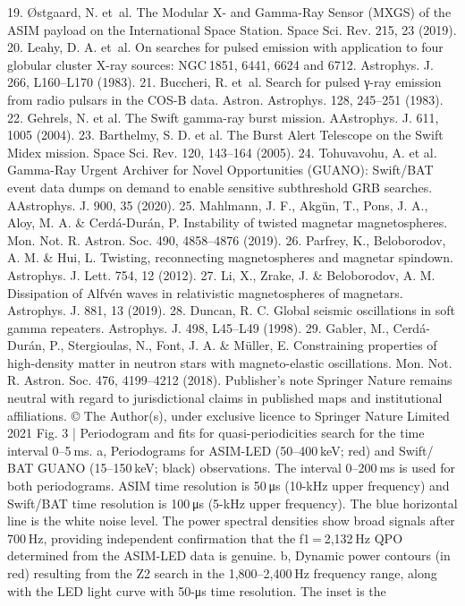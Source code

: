 19.
Østgaard, N. et al. The Modular X- and Gamma-Ray Sensor (MXGS) of the ASIM payload
on the International Space Station. Space Sci. Rev. 215, 23 (2019).
20.	 Leahy, D. A. et al. On searches for pulsed emission with application to four globular cluster
X-ray sources: NGC 1851, 6441, 6624 and 6712. Astrophys. J. 266, L160–L170 (1983).
21.
Buccheri, R. et al. Search for pulsed γ-ray emission from radio pulsars in the COS-B data.
Astron. Astrophys. 128, 245–251 (1983).
22.	 Gehrels, N. et al. The Swift gamma-ray burst mission. AAstrophys. J. 611, 1005 (2004).
23.	 Barthelmy, S. D. et al. The Burst Alert Telescope on the Swift Midex mission. Space Sci.
Rev. 120, 143–164 (2005).
24.	 Tohuvavohu, A. et al. Gamma-Ray Urgent Archiver for Novel Opportunities (GUANO):
Swift/BAT event data dumps on demand to enable sensitive subthreshold GRB searches.
AAstrophys. J. 900, 35 (2020).
25.	 Mahlmann, J. F., Akgün, T., Pons, J. A., Aloy, M. A. \& Cerdá-Durán, P. Instability of twisted
magnetar magnetospheres. Mon. Not. R. Astron. Soc. 490, 4858–4876 (2019).
26.	 Parfrey, K., Beloborodov, A. M. \& Hui, L. Twisting, reconnecting magnetospheres and
magnetar spindown. Astrophys. J. Lett. 754, 12 (2012).
27.
Li, X., Zrake, J. \& Beloborodov, A. M. Dissipation of Alfvén waves in relativistic
magnetospheres of magnetars. Astrophys. J. 881, 13 (2019).
28.	 Duncan, R. C. Global seismic oscillations in soft gamma repeaters. Astrophys. J. 498,
L45–L49 (1998).
29.	 Gabler, M., Cerdá-Durán, P., Stergioulas, N., Font, J. A. \& Müller, E. Constraining properties
of high-density matter in neutron stars with magneto-elastic oscillations. Mon. Not. R.
Astron. Soc. 476, 4199–4212 (2018).
Publisher’s note Springer Nature remains neutral with regard to jurisdictional claims in
published maps and institutional affiliations.
© The Author(s), under exclusive licence to Springer Nature Limited 2021
Fig. 3 | Periodogram and fits for quasi-periodicities search for the time
interval 0–5 ms. a, Periodograms for ASIM-LED (50–400 keV; red) and Swift/
BAT GUANO (15–150 keV; black) observations. The interval 0–200 ms is used for
both periodograms. ASIM time resolution is 50 μs (10-kHz upper frequency) and
Swift/BAT time resolution is 100 μs (5-kHz upper frequency). The blue horizontal
line is the white noise level. The power spectral densities show broad signals after
700 Hz, providing independent confirmation that the f1 = 2,132 Hz QPO
determined from the ASIM-LED data is genuine. b, Dynamic power contours
(in red) resulting from the Z2 search in the 1,800–2,400 Hz frequency range,
along with the LED light curve with 50-μs time resolution. The inset is the
